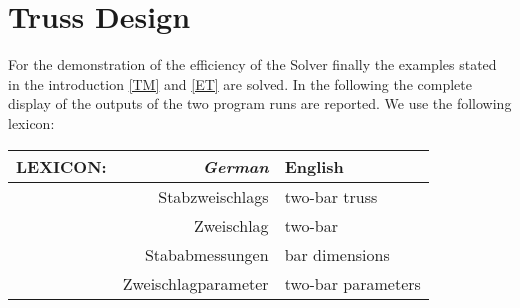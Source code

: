 \section{Truss Design}

For the demonstration of the efficiency of the Solver finally the examples stated in the introduction \ref{TM}  and \ref{ET} are solved. In the following  the complete display of the outputs of the two program runs are reported. We use the following lexicon:

\begin{center}
\begin {tabular} {r r | l  }
{\sf LEXICON:} & {\it\color{black} German} & {\color{blue} English }  \\
\hline
   & Stabzweischlags & \color{blue} two-bar truss \\
     &  Zweischlag &  \color{blue} two-bar \\
     &  Stababmessungen &  \color{blue} bar dimensions \\
     &  Zweischlagparameter &  \color{blue} two-bar parameters 
\end {tabular}
\end{center}



